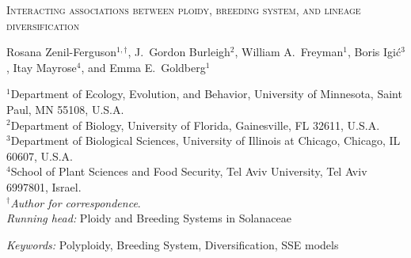 \documentclass[11pt]{article}
\begin{document}

%
%
%
%
%
%
%
%
\begin{center}
    \textsc{Interacting associations between ploidy, breeding system, and lineage diversification}

\vfill

\noindent
Rosana Zenil-Ferguson$^{1,\dagger}$,
%
\noindent
J.~Gordon Burleigh$^{2}$,
%
\noindent
William A.~Freyman$^{1}$,
%
\noindent
Boris Igi\'c$^{3}$,
%
\noindent
Itay Mayrose$^{4}$,
%
and
Emma E.~Goldberg$^{1}$
%
\end{center}

%
\noindent$^{1}$Department of Ecology, Evolution, and Behavior, University of Minnesota, Saint Paul, MN 55108, U.S.A.\\
\noindent$^{2}$Department of Biology, University of Florida, Gainesville, FL 32611, U.S.A.\\
\noindent$^{3}$Department of Biological Sciences, University of Illinois at Chicago, Chicago, IL 60607, U.S.A. \\
\noindent$^{4}$School of Plant Sciences and Food Security, Tel Aviv University, Tel Aviv 6997801, Israel.\\
\noindent$^\dagger$\textit{Author for correspondence}.\\
\vfill
\noindent\textit{Running head:} Ploidy and Breeding Systems in Solanaceae

\noindent
\textit{Keywords:} 
Polyploidy,
Breeding System,
Diversification, SSE models
\end{document}
